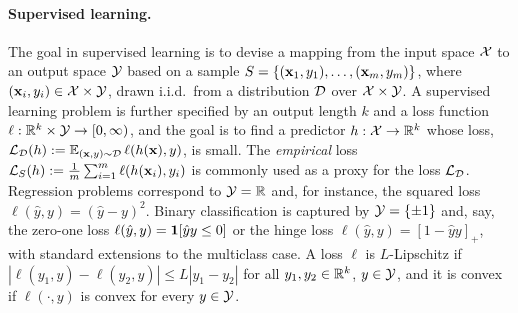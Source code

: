 \paragraph{Supervised learning.} The goal in supervised learning is to
devise a mapping from the input space ${\cal X}$ to an output space ${\cal Y}$ based on a sample
$S=\{({\mathbf x}_1,y_1),\ldots,({\mathbf x}_m,y_m)\}$, where $({\mathbf x}_i,y_i)\in{\cal X}\times{\cal Y}$, 
drawn i.i.d.\ from a distribution ${\cal D}$ over ${\cal X}\times{\cal Y}$.
%
A supervised learning problem is further specified by an output length $k$ and a loss function
$\ell : {\mathbb R}^k \times {\cal Y} \to [0,\infty)$, and the goal is to find a
predictor $h:{\cal X}\to{\mathbb R}^k$ whose loss,
${\cal L}_{{\cal D}}(h) := \operatorname*{\mathbb{E}}_{({\mathbf x},y)\sim{\cal D}} \ell(h({\mathbf x}),y)$, is small.
%
The {\em empirical} loss ${\cal L}_{S}(h):= \frac 1 m \sum_{i=1}^m
\ell(h({\mathbf x}_i),y_i)$ is commonly used as a proxy for the loss
${\cal L}_{{\cal D}}$.
%
Regression problems correspond to ${\cal Y}={\mathbb R}$ and, for
instance, the squared loss $\ell(\hat y,y)=(\hat y -y)^2$.
%
Binary classification is captured by ${\cal Y}=\{\pm 1\}$ and, say, the
zero-one loss $\ell(\hat y,y)= \mathbf{1}[\hat y y \leq 0]$ or the hinge
loss $\ell(\hat y,y)=[1-\hat y y]_+$, with standard extensions to the
multiclass case.
A loss $\ell$ is $L$-Lipschitz if $|\ell(y_1,y) - \ell(y_2,y) | \leq L
|y_1 - y_2|$ for all $y_1,y_2 \in {\mathbb R}^k$, $y \in {\cal Y}$, and it is
convex if $\ell(\cdot,y)$ is convex for every $y\in{\cal Y}$.

